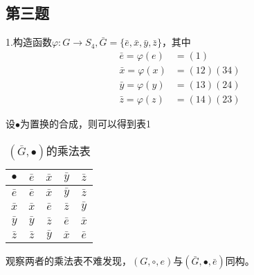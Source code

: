 \documentclass[12pt,onecolumn]{article}
\theoremstyle{plain}
\begin{document}
\subsection{第三题}
1.构造函数$\varphi:G \to S_4, \bar{G} = \{\bar{e}, \bar{x}, \bar{y}, \bar{z}\}$，其中
\begin{align*}
  \bar{e} = \varphi(e) & = (1)        \\
  \bar{x} = \varphi(x) & = (1 2)(3 4) \\
  \bar{y} = \varphi(y) & = (1 3)(2 4) \\
  \bar{z} = \varphi(z) & = (1 4)(2 3)
\end{align*}

设$\bullet$为置换的合成，则可以得到表1
\begin{table}[H]
  \centering
  \begin{tabular}{c|cccc}
    \toprule
    $\bullet$ & $\bar{e}$ & $\bar{x}$ & $\bar{y}$ & $\bar{z}$ \\
    \midrule
    $\bar{e}$ & $\bar{e}$ & $\bar{x}$ & $\bar{y}$ & $\bar{z}$ \\
    \midrule
    $\bar{x}$ & $\bar{x}$ & $\bar{e}$ & $\bar{z}$ & $\bar{y}$ \\
    \midrule
    $\bar{y}$ & $\bar{y}$ & $\bar{z}$ & $\bar{e}$ & $\bar{x}$ \\
    \midrule
    $\bar{z}$ & $\bar{z}$ & $\bar{y}$ & $\bar{x}$ & $\bar{e}$ \\
    \bottomrule
  \end{tabular}
  \caption{$(\bar{G}, \bullet)$的乘法表}
\end{table}

观察两者的乘法表不难发现，$(G, \circ, e)$与$(\bar{G}, \bullet, \bar{e})$同构。
\end{document}
